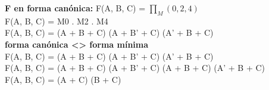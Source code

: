 \documentclass{article}
\begin{document}
                \newline\textbf{F en forma canónica:}
                \newline
                F(A, B, C) = $\prod_M(0,2,4)$\\
                F(A, B, C) = M0 . M2 . M4\\
                F(A, B, C) = (A + B + C) (A + B’ + C) (A’ + B + C)\\
                \newline\textbf{forma canónica <> forma mínima\\}
                \newline
                F(A, B, C) = (A + B + C) (A + B’ + C) (A’ + B + C)\\
                F(A, B, C) = (A + B + C) (A + B’ + C) (A + B + C) (A’ + B + C)\\
                F(A, B, C) = (A + C) (B + C)\\
\end{document}

